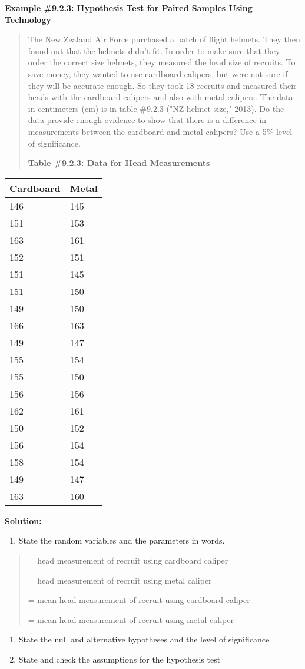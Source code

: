 \documentclass[]{book}
\providecommand{\tightlist}{%
  \setlength{\itemsep}{0pt}\setlength{\parskip}{0pt}}
\begin{document}
\textbf{Example \#9.2.3: Hypothesis Test for Paired Samples Using Technology}

\begin{quote}
The New Zealand Air Force purchased a batch of flight helmets. They then found out that the helmets didn't fit. In order to make sure that they order the correct size helmets, they measured the head size of recruits. To save money, they wanted to use cardboard calipers, but were not sure if they will be accurate enough. So they took 18 recruits and measured their heads with the cardboard calipers and also with metal calipers. The data in centimeters (cm) is in table \#9.2.3 ("NZ helmet size," 2013). Do the data provide enough evidence to show that there is a difference in measurements between the cardboard and metal calipers? Use a 5\% level of significance.

\textbf{Table \#9.2.3: Data for Head Measurements}
\end{quote}

\begin{longtable}[]{@{}ll@{}}
\toprule
Cardboard & Metal\tabularnewline
\midrule
\endhead
146 & 145\tabularnewline
151 & 153\tabularnewline
163 & 161\tabularnewline
152 & 151\tabularnewline
151 & 145\tabularnewline
151 & 150\tabularnewline
149 & 150\tabularnewline
166 & 163\tabularnewline
149 & 147\tabularnewline
155 & 154\tabularnewline
155 & 150\tabularnewline
156 & 156\tabularnewline
162 & 161\tabularnewline
150 & 152\tabularnewline
156 & 154\tabularnewline
158 & 154\tabularnewline
149 & 147\tabularnewline
163 & 160\tabularnewline
\bottomrule
\end{longtable}

\textbf{Solution:}

\begin{enumerate}
\def\labelenumi{\arabic{enumi}.}
\tightlist
\item
  State the random variables and the parameters in words.
\end{enumerate}

\begin{quote}
= head measurement of recruit using cardboard caliper

= head measurement of recruit using metal caliper

= mean head measurement of recruit using cardboard caliper

= mean head measurement of recruit using metal caliper
\end{quote}

\begin{enumerate}
\def\labelenumi{\arabic{enumi}.}
\setcounter{enumi}{1}
\item
  State the null and alternative hypotheses and the level of significance
\item
  State and check the assumptions for the hypothesis test
\end{enumerate}
\end{document}
